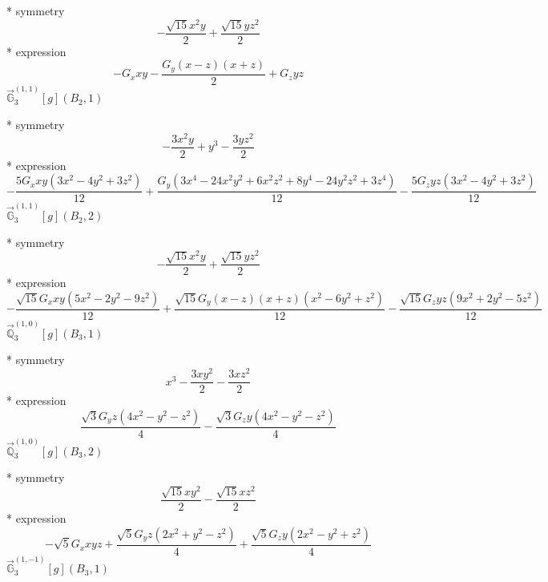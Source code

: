 \documentclass[fleqn,8pt]{jsarticle}
\begin{document}
\noindent\quad ** symmetry
\begin{dmath*}
- \frac{\sqrt{15} x^{2} y}{2} + \frac{\sqrt{15} y z^{2}}{2}
\end{dmath*}
\noindent\quad ** expression
\begin{dmath*}
- G_{x} x y - \frac{G_{y} \left(x - z\right) \left(x + z\right)}{2} + G_{z} y z
\end{dmath*}
\noindent\quad $\vec{\mathbb{G}}_{3}^{(1,1)}[g](B_{2},1)$

\noindent\quad ** symmetry
\begin{dmath*}
- \frac{3 x^{2} y}{2} + y^{3} - \frac{3 y z^{2}}{2}
\end{dmath*}
\noindent\quad ** expression
\begin{dmath*}
- \frac{5 G_{x} x y \left(3 x^{2} - 4 y^{2} + 3 z^{2}\right)}{12} + \frac{G_{y} \left(3 x^{4} - 24 x^{2} y^{2} + 6 x^{2} z^{2} + 8 y^{4} - 24 y^{2} z^{2} + 3 z^{4}\right)}{12} - \frac{5 G_{z} y z \left(3 x^{2} - 4 y^{2} + 3 z^{2}\right)}{12}
\end{dmath*}
\noindent\quad $\vec{\mathbb{G}}_{3}^{(1,1)}[g](B_{2},2)$

\noindent\quad ** symmetry
\begin{dmath*}
- \frac{\sqrt{15} x^{2} y}{2} + \frac{\sqrt{15} y z^{2}}{2}
\end{dmath*}
\noindent\quad ** expression
\begin{dmath*}
- \frac{\sqrt{15} G_{x} x y \left(5 x^{2} - 2 y^{2} - 9 z^{2}\right)}{12} + \frac{\sqrt{15} G_{y} \left(x - z\right) \left(x + z\right) \left(x^{2} - 6 y^{2} + z^{2}\right)}{12} - \frac{\sqrt{15} G_{z} y z \left(9 x^{2} + 2 y^{2} - 5 z^{2}\right)}{12}
\end{dmath*}
\noindent\quad $\vec{\mathbb{Q}}_{3}^{(1,0)}[g](B_{3},1)$

\noindent\quad ** symmetry
\begin{dmath*}
x^{3} - \frac{3 x y^{2}}{2} - \frac{3 x z^{2}}{2}
\end{dmath*}
\noindent\quad ** expression
\begin{dmath*}
\frac{\sqrt{3} G_{y} z \left(4 x^{2} - y^{2} - z^{2}\right)}{4} - \frac{\sqrt{3} G_{z} y \left(4 x^{2} - y^{2} - z^{2}\right)}{4}
\end{dmath*}
\noindent\quad $\vec{\mathbb{Q}}_{3}^{(1,0)}[g](B_{3},2)$

\noindent\quad ** symmetry
\begin{dmath*}
\frac{\sqrt{15} x y^{2}}{2} - \frac{\sqrt{15} x z^{2}}{2}
\end{dmath*}
\noindent\quad ** expression
\begin{dmath*}
- \sqrt{5} G_{x} x y z + \frac{\sqrt{5} G_{y} z \left(2 x^{2} + y^{2} - z^{2}\right)}{4} + \frac{\sqrt{5} G_{z} y \left(2 x^{2} - y^{2} + z^{2}\right)}{4}
\end{dmath*}
\noindent\quad $\vec{\mathbb{G}}_{3}^{(1,-1)}[g](B_{3},1)$
\end{document}
